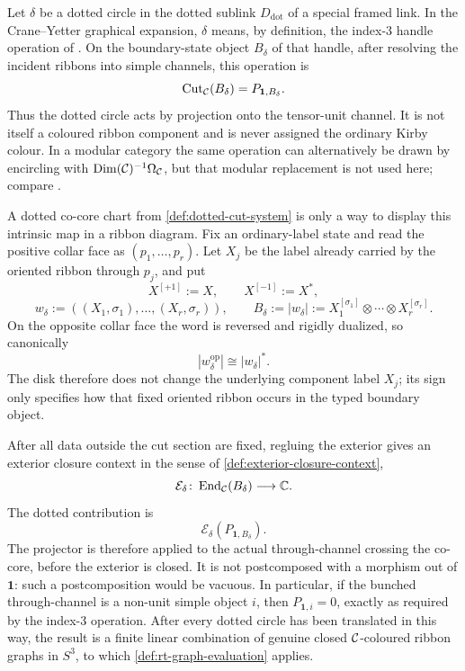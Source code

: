 \begin{definition}
\label{def:dotted-circle-translation}
Let $\delta$ be a dotted circle in the dotted sublink
$D_{\mathrm{dot}}$ of a special framed link.  In the Crane--Yetter
graphical expansion, $\delta$ means, by definition, the index-$3$ handle
operation of \cite[Definition~5.11, $k=3$]{Tham2021}.  On the boundary-state
object $B_\delta$ of that handle, after resolving the incident ribbons into
simple channels, this operation is
\[
  \operatorname{Cut}_{\mathcal{C}}(B_\delta)=P_{\mathbf1,B_\delta}.
\]
Thus the dotted circle acts by projection onto the tensor-unit
channel.  It is not itself a
coloured ribbon component and is never assigned the ordinary Kirby colour.
In a modular category the same operation can alternatively be drawn by
encircling with $\operatorname{Dim}(\mathcal{C})^{-1}\Omega_{\mathcal{C}}$, but that
modular replacement is not used here; compare
\cite[Definition~5.11 and Lemma~2.31]{Tham2021}.

A dotted co-core chart from \cref{def:dotted-cut-system} is only a way to
display this intrinsic map in a ribbon diagram.  Fix an ordinary-label state
and read the positive collar face as $(p_1,\ldots,p_r)$.  Let $X_j$ be the
label already carried by the oriented ribbon through $p_j$, and put
\[
  X^{[+1]}:=X,\qquad X^{[-1]}:=X^*,
\]
\[
  w_\delta:=((X_1,\sigma_1),\ldots,(X_r,\sigma_r)),
  \qquad
  B_\delta:=|w_\delta|
  :=X_1^{[\sigma_1]}\otimes\cdots\otimes X_r^{[\sigma_r]}.
\]
On the opposite collar face the word is reversed and rigidly dualized, so
canonically
\[
  |w_\delta^{\mathrm{op}}|\cong |w_\delta|^*.
\]
The disk therefore does not change the underlying component label $X_j$;
its sign only specifies how that fixed oriented ribbon occurs in the typed
boundary object.

After all data outside the cut section are fixed, regluing the exterior gives
an exterior closure context in the sense of
\cref{def:exterior-closure-context},
\[
  \mathcal E_\delta\colon
  \operatorname{End}_{\mathcal{C}}(B_\delta)\longrightarrow\mathbb C.
\]
The dotted contribution is
\[
  \mathcal E_\delta(P_{\mathbf1,B_\delta}).
  \tag{3.1}\label{eq:intrinsic-dotted-context}
\]
The projector is therefore applied to the actual through-channel crossing the
co-core, before the exterior is closed.  It is not postcomposed with a
morphism out of $\mathbf1$: such a postcomposition would be vacuous.  In
particular, if the bunched through-channel is a non-unit simple object $i$,
then $P_{\mathbf1,i}=0$, exactly as required by the index-$3$ operation.
After every dotted circle has been translated in this way,
the result is a finite linear combination of genuine closed
$\mathcal{C}$-coloured ribbon graphs in $S^3$, to which
\cref{def:rt-graph-evaluation} applies.
\end{definition}

